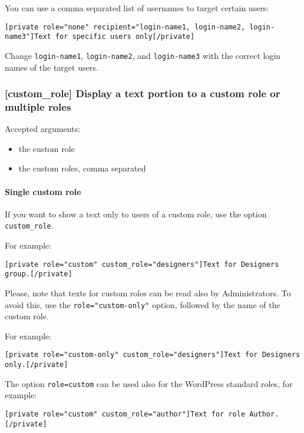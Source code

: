 \documentclass[a4paper,10pt]{article}
\begin{document}
You can use a comma separated list of usernames to target certain users:

\begin{lstlisting}
[private role="none" recipient="login-name1, login-name2, login-name3"]Text for specific users only[/private]
\end{lstlisting}

Change \verb+login-name1+, \verb+login-name2+, and \verb+login-name3+ with the correct login names of the target users.

\subsubsection{[custom\_role] Display a text portion to a custom role or multiple roles}

Accepted arguments:

\begin{itemize}
 \item the custom role
 \item the custom roles, comma separated
\end{itemize}

\paragraph{Single custom role}

If you want to show a text only to users of a custom role, use the option \verb+custom_role+.

For example:

\begin{lstlisting}
[private role="custom" custom_role="designers"]Text for Designers group.[/private]
\end{lstlisting}


Please, note that texts for custom roles can be read also by Administrators. To avoid this, use the \verb+role="custom-only"+ option, followed by the name of the custom role.

For example:

\begin{lstlisting}
[private role="custom-only" custom_role="designers"]Text for Designers only.[/private]
\end{lstlisting}


The option \verb+role=custom+ can be used also for the WordPress standard roles, for example:

\begin{lstlisting}
[private role="custom" custom_role="author"]Text for role Author.[/private]
\end{lstlisting}
\end{document}
